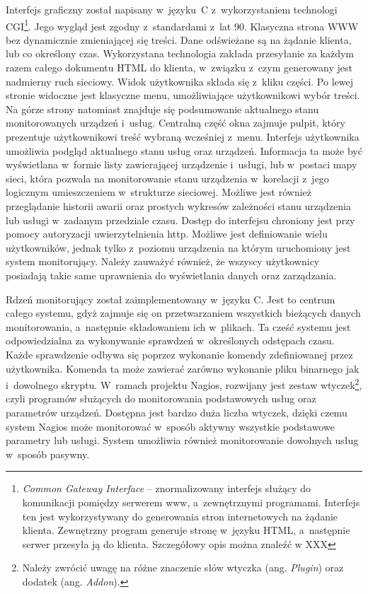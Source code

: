 Interfejs graficzny został napisany w~języku~C z~wykorzystaniem
technologi CGI\footnote{{\em Common Gateway Interface} --
  znormalizowany interfejs służący do komunikacji pomiędzy serwerem
  www, a~zewnętrznymi programami. Interfejs ten jest wykorzystywany do
  generowania stron internetowych na żądanie klienta. Zewnętrzny
  program generuje stronę w~języku HTML, a~następnie serwer przesyła
  ją do klienta. Szczegółowy opis można znaleźć w XXX}. Jego wygląd
jest zgodny z~standardami z~lat 90. Klasyczna strona WWW bez
dynamicznie zmieniającej się treści. Dane odświeżane są na żądanie
klienta, lub co określony czas. Wykorzystana technologia zakłada
przesyłanie za każdym razem całego dokumentu HTML do klienta,
w~związku z~czym generowany jest nadmierny ruch sieciowy. Widok
użytkownika składa się z~kliku części. Po lewej stronie widoczne jest
klasyczne menu, umożliwiające użytkownikowi wybór treści. Na górze
strony natomiast znajduje się podsumowanie aktualnego stanu
monitorowanych urządzeń i~usług. Centralną część okna zajmuje pulpit,
który prezentuje użytkownikowi treść wybraną wcześniej
z~menu. Interfejs użytkownika umożliwia podgląd aktualnego stanu usług
oraz urządzeń. Informacja ta może być wyświetlana w~formie listy
zawierającej urządzenie i~usługi, lub w~postaci mapy sieci, która
pozwala na monitorowanie stanu urządzenia w~korelacji z~jego logicznym
umieszczeniem w~strukturze sieciowej. Możliwe jest również
przeglądanie historii awarii oraz prostych wykresów zależności stanu
urządzenia lub usługi w~zadanym przedziale czasu. Dostęp do interfejsu
chroniony jest przy pomocy autoryzacji uwierzytelnienia http. Możliwe
jest definiowanie wielu użytkowników, jednak tylko z~poziomu
urządzenia na którym uruchomiony jest system monitorujący. Należy
zauważyć również, że wszyscy użytkownicy posiadają takie same
uprawnienia do wyświetlania danych oraz zarządzania.

Rdzeń monitorujący został zaimplementowany w~języku C. Jest to centrum
całego systemu, gdyż zajmuje się on przetwarzaniem wszystkich
bieżących danych monitorowania, a~następnie składowaniem ich
w~plikach. Ta cześć systemu jest odpowiedzialna za wykonywanie
sprawdzeń w~określonych odstępach czasu. Każde sprawdzenie odbywa się
poprzez wykonanie komendy zdefiniowanej przez użytkownika. Komenda ta
może zawierać zarówno wykonanie pliku binarnego jak i~dowolnego
skryptu. W~ramach projektu Nagios, rozwijany jest zestaw
wtyczek\footnote{Należy zwrócić uwagę na różne znaczenie słów wtyczka
  (ang. {\em Plugin}) oraz dodatek (ang. {\em Addon}). }, czyli
programów służących do monitorowania podstawowych usług oraz
parametrów urządzeń. Dostępna jest bardzo duża liczba wtyczek, dzięki
czemu system Nagios może monitorować w~sposób aktywny wszystkie
podstawowe parametry lub usługi. System umożliwia również monitorowanie
dowolnych usług w~sposób pasywny.

